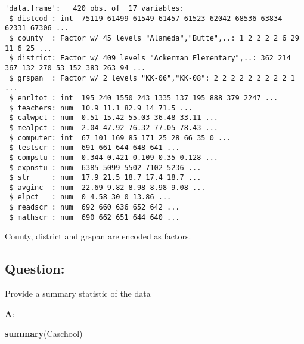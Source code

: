 \documentclass[12pt,]{article}
\newenvironment{Shaded}{\begin{snugshade}}{\end{snugshade}}
\newcommand{\KeywordTok}[1]{\textcolor[rgb]{0.13,0.29,0.53}{\textbf{#1}}}
\newcommand{\NormalTok}[1]{#1}
\begin{document}
\begin{verbatim}
'data.frame':   420 obs. of  17 variables:
 $ distcod : int  75119 61499 61549 61457 61523 62042 68536 63834 62331 67306 ...
 $ county  : Factor w/ 45 levels "Alameda","Butte",..: 1 2 2 2 2 6 29 11 6 25 ...
 $ district: Factor w/ 409 levels "Ackerman Elementary",..: 362 214 367 132 270 53 152 383 263 94 ...
 $ grspan  : Factor w/ 2 levels "KK-06","KK-08": 2 2 2 2 2 2 2 2 2 1 ...
 $ enrltot : int  195 240 1550 243 1335 137 195 888 379 2247 ...
 $ teachers: num  10.9 11.1 82.9 14 71.5 ...
 $ calwpct : num  0.51 15.42 55.03 36.48 33.11 ...
 $ mealpct : num  2.04 47.92 76.32 77.05 78.43 ...
 $ computer: int  67 101 169 85 171 25 28 66 35 0 ...
 $ testscr : num  691 661 644 648 641 ...
 $ compstu : num  0.344 0.421 0.109 0.35 0.128 ...
 $ expnstu : num  6385 5099 5502 7102 5236 ...
 $ str     : num  17.9 21.5 18.7 17.4 18.7 ...
 $ avginc  : num  22.69 9.82 8.98 8.98 9.08 ...
 $ elpct   : num  0 4.58 30 0 13.86 ...
 $ readscr : num  692 660 636 652 642 ...
 $ mathscr : num  690 662 651 644 640 ...
\end{verbatim}

County, district and grspan are encoded as factors.

\hypertarget{question-2}{%
\subsection{Question:}\label{question-2}}

Provide a summary statistic of the data

\textbf{A}:

\begin{Shaded}
\begin{Highlighting}[]
\KeywordTok{summary}\NormalTok{(Caschool)}
\end{Highlighting}
\end{Shaded}
\end{document}
